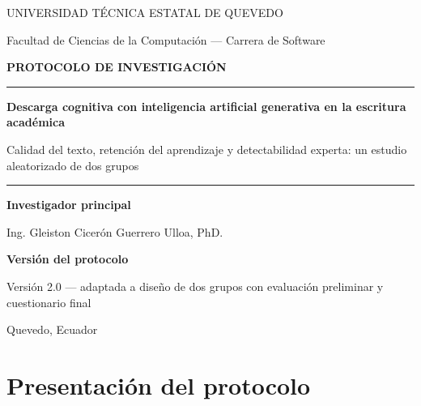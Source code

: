 \documentclass[12pt,a4paper,openany]{report}
\begin{document}
    
    \begin{titlepage}
        \centering
        \vspace*{1.5cm}
        {\sffamily\large\color{grismedio} UNIVERSIDAD T\'ECNICA ESTATAL DE QUEVEDO\par}
        {\sffamily\normalsize\color{grismedio} Facultad de Ciencias de la Computaci\'on --- Carrera de Software\par}
        \vspace{2.2cm}
        {\sffamily\Large\bfseries\color{azulinstitucional} PROTOCOLO DE INVESTIGACI\'ON\par}
        \vspace{1.0cm}
        \rule{\textwidth}{1.2pt}
        \vspace{0.8cm}
        {\sffamily\LARGE\bfseries Descarga cognitiva con inteligencia artificial generativa en la escritura acad\'emica\par}
        \vspace{0.5cm}
        {\sffamily\large Calidad del texto, retenci\'on del aprendizaje y detectabilidad experta: un estudio aleatorizado de dos grupos\par}
        \vspace{0.8cm}
        \rule{\textwidth}{1.2pt}
        \vfill
        {\sffamily\normalsize\textbf{Investigador principal}\par}
        {\normalsize Ing. Gleiston Cicer\'on Guerrero Ulloa, PhD.\par}
        \vspace{0.6cm}
        {\sffamily\normalsize\textbf{Versi\'on del protocolo}\par}
        {\normalsize Versi\'on 2.0 --- adaptada a dise\~no de dos grupos con evaluaci\'on preliminar y cuestionario final\par}
        \vspace{0.6cm}
        {\normalsize\color{grismedio} Quevedo, Ecuador\par}
        \vspace{1.0cm}
    \end{titlepage}
    
    \tableofcontents
    \clearpage
    
    \chapter{Presentaci\'on del protocolo}
    
\end{document}
